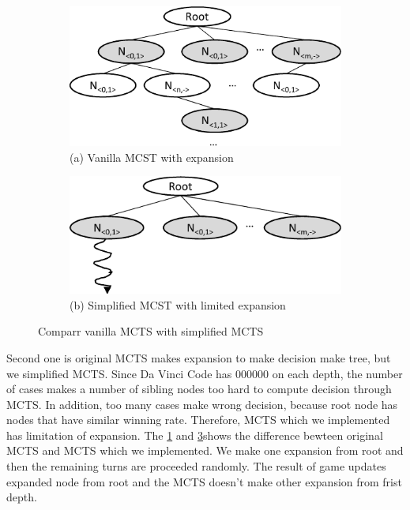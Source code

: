 \documentclass[conference]{IEEEtran}
\begin{document}
\begin{figure}
\begin{subfigure}[b]{0.95\columnwidth}
\includegraphics [width=0.95\columnwidth]{figures/sub_compare_expansion_1.pdf}
\caption{(a) Vanilla MCST with expansion}
\label{fig:expansion}
\end{subfigure}
\par\bigskip
\begin{subfigure}[b]{0.95\columnwidth}
\includegraphics [width=0.95\columnwidth]{figures/sub_compare_expansion_2.pdf}
\caption{(b) Simplified MCST with limited expansion}
\label{fig:limited_expansion}
\end{subfigure}
\caption{Comparr vanilla MCTS with simplified MCTS}
\end{figure}

Second one is original MCTS makes expansion to make decision make tree, but we simplified MCTS. 
Since Da Vinci Code has 000000 on each depth, the number of cases makes a number of sibling nodes too hard to compute decision through MCTS. 
In addition, too many cases make wrong decision, because root node has nodes that have similar winning rate. 
Therefore, MCTS which we implemented has limitation of expansion. 
The \cref{fig:expansion} and \cref{fig:limited_expansion}shows the difference bewteen original MCTS and MCTS which we implemented. 
We make one expansion from root and then the remaining turns are proceeded randomly. 
The result of game updates expanded node from root and the MCTS doesn't make other expansion from frist depth. 
\end{document}
